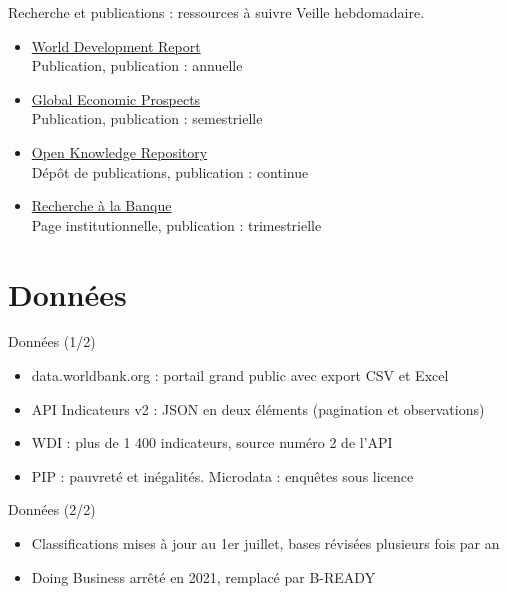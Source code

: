 \documentclass[aspectratio=169,11pt]{beamer}
\begin{document}
\begin{frame}{Recherche et publications : ressources à suivre}
\small
Veille hebdomadaire.
\begin{itemize}
\item \href{https://www.worldbank.org/en/publication/wdr}{World Development Report}\\{\footnotesize Publication, publication : annuelle}
\item \href{https://www.worldbank.org/en/publication/global-economic-prospects}{Global Economic Prospects}\\{\footnotesize Publication, publication : semestrielle}
\item \href{https://openknowledge.worldbank.org}{Open Knowledge Repository}\\{\footnotesize Dépôt de publications, publication : continue}
\item \href{https://www.worldbank.org/en/research}{Recherche à la Banque}\\{\footnotesize Page institutionnelle, publication : trimestrielle}
\end{itemize}
\end{frame}

\section{Données}
\begin{frame}{Données (1/2)}
\begin{itemize}
\item data.worldbank.org : portail grand public avec export CSV et Excel
\item API Indicateurs v2 : JSON en deux éléments (pagination et observations)
\item WDI : plus de 1 400 indicateurs, source numéro 2 de l'API
\item PIP : pauvreté et inégalités. Microdata : enquêtes sous licence
\end{itemize}
\end{frame}

\begin{frame}{Données (2/2)}
\begin{itemize}
\item Classifications mises à jour au 1er juillet, bases révisées plusieurs fois par an
\item Doing Business arrêté en 2021, remplacé par B-READY
\end{itemize}
\end{frame}
\end{document}
